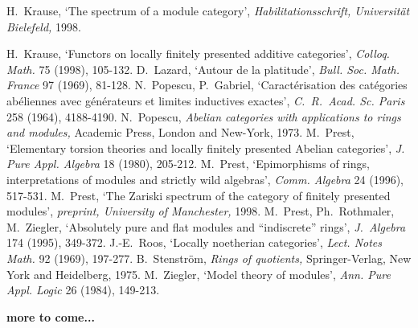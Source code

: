 \documentclass[12pt]{article}
\theoremstyle{plain}
\theoremstyle{definition}
\numberwithin{equation}{section}
\begin{document}
\begin{thebibliography}{99}
 {\sc H.~Krause}, `The spectrum of a module category',
{\em Habilitationsschrift, Universit\"at Bielefeld,} 1998.

{\sc H.~Krause}, `Functors on locally finitely presented additive categories', {\em Colloq. Math.} 75 (1998), 105-132.
 {\sc D.~Lazard}, `Autour de la platitude', {\em Bull. Soc.
                  Math. France\/} 97 (1969), 81-128.
 {\sc N.~Popescu, P.~Gabriel}, `Caract\'erisation des cat\'egories
                  ab\'eliennes avec g\'en\'erateurs et limites inductives
                  exactes', {\em C.~R.~Acad. Sc. Paris\/} 258 (1964), 4188-4190.
 {\sc N.~Popescu}, {\em Abelian categories with applications
                  to rings and modules,} Academic Press, London and New-York, 1973.
 {\sc M.~Prest}, `Elementary torsion theories and locally
                  finitely presented Abelian categories', {\em J. Pure
                  Appl. Algebra\/} 18 (1980), 205-212.
 {\sc M.~Prest}, `Epimorphisms of rings, interpretations of
                  modules and strictly wild algebras', {\em Comm. Algebra\/}
                  24 (1996), 517-531.
 {\sc M.~Prest}, `The Zariski spectrum of the category of
                  finitely presented modules', {\em preprint, University of
                  Manchester,} 1998.
 {\sc M.~Prest, Ph.~Rothmaler, M.~Ziegler}, `Absolutely pure
                  and flat modules and ``indiscrete'' rings', {\em J.~Algebra\/}
                  174 (1995), 349-372.
 {\sc J.-E.~Roos}, `Locally noetherian categories',
                  {\em Lect. Notes Math.} 92 (1969), 197-277.
 {\sc B.~Stenstr\"om}, {\em Rings of quotients,} Springer-Verlag,
                  New York and Heidelberg, 1975.
 {\sc M.~Ziegler}, `Model theory of modules',
                  {\em Ann. Pure Appl. Logic\/} 26 (1984), 149-213.
\end{thebibliography}


{\bf more to come...}

\end{document}
